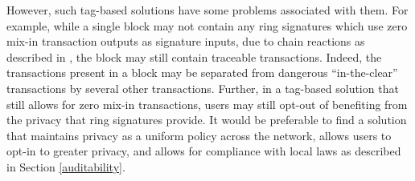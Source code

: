 \documentclass[12pt,english]{mrl}
\theoremstyle{definition}
\numberwithin{equation}{section}
\numberwithin{figure}{section}
\numberwithin{equation}{section}
\numberwithin{equation}{section}
\numberwithin{figure}{section}
\begin{document}
However, such tag-based solutions have some problems associated with them. For example, while a single block may not contain any ring signatures which use zero mix-in transaction outputs as signature inputs, due to chain reactions as described in \cite{chainReactions}, the block may still contain traceable transactions. Indeed, the transactions present in a block may be separated from dangerous ``in-the-clear'' transactions by several other transactions. Further, in a tag-based solution that still allows for zero mix-in transactions, users may still opt-out of benefiting from the privacy that ring signatures provide. It would be preferable to find a solution that maintains privacy as a uniform policy across the network, allows users to opt-in to greater privacy, and allows for compliance with local laws as described in Section \ref{auditability}.
\end{document}
